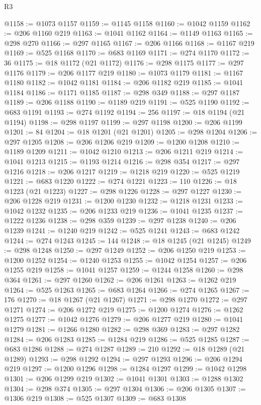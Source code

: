 \begin{lexlean}{R3}
\begin{coremodule}
@1158 := @1073 @1157
@1159 := @1145 @1158
@1160 := @1042 @1159
@1162 := @206 @1160 @219
@1163 := @1041 @1162
@1164 := @1149 @1163
@1165 := @298 @270
@1166 := @297 @1165
@1167 := @206 @1166
@1168 := @1167 @219
@1169 := @525 @1168
@1170 := @683 @1169
@1171 := @274 @1170
@1172 := 36
@1175 := @18 @1172 (@21 @1172)
@1176 := @298 @1175
@1177 := @297 @1176
@1179 := @206 @1177 @219
@1180 := @1073 @1179
@1181 := @1167 @1180
@1182 := @1042 @1181
@1184 := @206 @1182 @219
@1185 := @1041 @1184
@1186 := @1171 @1185
@1187 := @298 @349
@1188 := @297 @1187
@1189 := @206 @1188
@1190 := @1189 @219
@1191 := @525 @1190
@1192 := @683 @1191
@1193 := @274 @1192
@1194 := 256
@1197 := @18 @1194 (@21 @1194)
@1198 := @298 @1197
@1199 := @297 @1198
@1200 := @206 @1199
@1201 := 84
@1204 := @18 @1201 (@21 @1201)
@1205 := @298 @1204
@1206 := @297 @1205
@1208 := @206 @1206 @219
@1209 := @1200 @1208
@1210 := @1189 @1209
@1211 := @1042 @1210
@1213 := @206 @1211 @219
@1214 := @1041 @1213
@1215 := @1193 @1214
@1216 := @298 @354
@1217 := @297 @1216
@1218 := @206 @1217
@1219 := @1218 @219
@1220 := @525 @1219
@1221 := @683 @1220
@1222 := @274 @1221
@1223 := 110
@1226 := @18 @1223 (@21 @1223)
@1227 := @298 @1226
@1228 := @297 @1227
@1230 := @206 @1228 @219
@1231 := @1200 @1230
@1232 := @1218 @1231
@1233 := @1042 @1232
@1235 := @206 @1233 @219
@1236 := @1041 @1235
@1237 := @1222 @1236
@1238 := @298 @359
@1239 := @297 @1238
@1240 := @206 @1239
@1241 := @1240 @219
@1242 := @525 @1241
@1243 := @683 @1242
@1244 := @274 @1243
@1245 := 144
@1248 := @18 @1245 (@21 @1245)
@1249 := @298 @1248
@1250 := @297 @1249
@1252 := @206 @1250 @219
@1253 := @1200 @1252
@1254 := @1240 @1253
@1255 := @1042 @1254
@1257 := @206 @1255 @219
@1258 := @1041 @1257
@1259 := @1244 @1258
@1260 := @298 @364
@1261 := @297 @1260
@1262 := @206 @1261
@1263 := @1262 @219
@1264 := @525 @1263
@1265 := @683 @1264
@1266 := @274 @1265
@1267 := 176
@1270 := @18 @1267 (@21 @1267)
@1271 := @298 @1270
@1272 := @297 @1271
@1274 := @206 @1272 @219
@1275 := @1200 @1274
@1276 := @1262 @1275
@1277 := @1042 @1276
@1279 := @206 @1277 @219
@1280 := @1041 @1279
@1281 := @1266 @1280
@1282 := @298 @369
@1283 := @297 @1282
@1284 := @206 @1283
@1285 := @1284 @219
@1286 := @525 @1285
@1287 := @683 @1286
@1288 := @274 @1287
@1289 := 210
@1292 := @18 @1289 (@21 @1289)
@1293 := @298 @1292
@1294 := @297 @1293
@1296 := @206 @1294 @219
@1297 := @1200 @1296
@1298 := @1284 @1297
@1299 := @1042 @1298
@1301 := @206 @1299 @219
@1302 := @1041 @1301
@1303 := @1288 @1302
@1304 := @298 @374
@1305 := @297 @1304
@1306 := @206 @1305
@1307 := @1306 @219
@1308 := @525 @1307
@1309 := @683 @1308

\end{coremodule}
\end{lexlean}
